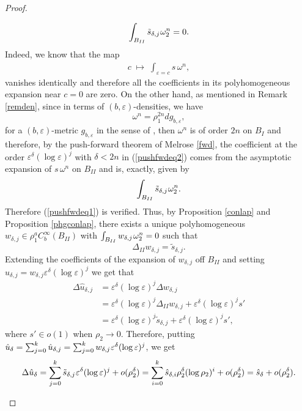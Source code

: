 \documentclass[a4paper,11pt]{article}
\begin{document}
\begin{proof}
\begin{itemize}
\begin{align} \label{pushfwdeq1}
    \int_{B_{II}} \tilde s_{\delta,j} \hspace{0.02cm} \omega_2^n =0.
   \end{align}
    Indeed, we know that the map 
\begin{align} \label{pushfwdeq2}
c \;\mapsto\; \int_{\varepsilon = c} 
s\, \omega^n,
\end{align}
vanishes identically and therefore all the coefficients in its polyhomogeneous expansion near $c=0$ are zero. On the other hand, as mentioned in Remark \ref{remden}, since in terms of $(b, \varepsilon)$-densities, we have  
$$
\omega^n = \rho_1^{2n} dg_{b,\varepsilon},
$$
for a $(b,\varepsilon)$-metric $g_{b,\varepsilon}$ in the sense of \cite{melrose_analytic_1995}, then $\omega^n$ is of order $2n$ on $B_I$ and therefore, by the push-forward theorem of Melrose \ref{fwd}, the coefficient at the order $\varepsilon^\delta (\log \varepsilon)^j$ with $\delta < 2n$ in (\ref{pushfwdeq2}) comes from the asymptotic expansion of $s\, \omega^n$ on $B_{II}$ and is, exactly, given by
$$\int_{B_{II}} \tilde s_{\delta,j} \hspace{0.02cm} \omega_2^n.$$
Therefore (\ref{pushfwdeq1}) is verified. Thus, by Proposition \ref{conlap} and Proposition \ref{phgconlap}, there exists a unique polyhomogeneous $w_{\delta,j} \in \rho_1^a C_b^\infty (B_{II})$ with $\int_{B_{II}} w_{\delta,j} \hspace{0.03cm} \omega_2^n = 0$ such that 
$$
\Delta_{II} w_{\delta,j} =  \tilde s_{\delta,j}.
$$
Extending the coefficients of the expansion of $w_{\delta,j}$ off $B_{II}$ and setting $\hat u_{\delta,j} = w_{\delta,j} \varepsilon^\delta (\log \varepsilon)^j$ we get that 
\begin{align*}
\Delta \hat u_{\delta,j} & = \varepsilon^\delta(\log \varepsilon)^j \Delta w_{\delta,j} \\& = \varepsilon^\delta (\log \varepsilon)^j\Delta_{II}  w_{\delta,j} + \varepsilon^\delta(\log \varepsilon)^j s'\\& = \varepsilon^\delta (\log \varepsilon)^j \tilde s_{\delta,j} + \varepsilon^\delta(\log \varepsilon)^j s', \end{align*}
where $s' \in o (1)$ when $ \rho_2 \rightarrow 0$. Therefore, putting $\hat u_{\delta} = \sum_{j=0}^k \hat u_{\delta,j}  = \sum_{j=0}^k w_{\delta,j} \hspace{0.02cm} \varepsilon^\delta (\log \varepsilon)^j$, we get
$$
\Delta \hat u_\delta = \sum_{j=0}^k \tilde s_{\delta,j} \hspace{0.02cm}  \varepsilon^\delta (\log \varepsilon)^j + o(\rho_2^\delta) = \sum_{i=0}^k \hat  s_{\delta, i} \rho_2^{\delta} (\log \rho_2)^i + o(\rho_2^\delta) = \hat s_\delta + o(\rho_2^\delta).
$$
\end{itemize}
\end{proof}
\end{document}
